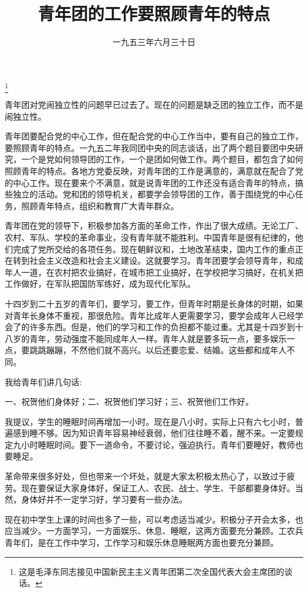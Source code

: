 
\title{青年团的工作要照顾青年的特点}
\date{一九五三年六月三十日}
\thanks{这是毛泽东同志接见中国新民主主义青年团第二次全国代表大会主席团的谈话。}
\maketitle


青年团对党闹独立性的问题早已过去了。现在的问题是缺乏团的独立工作，而不是闹独立性。

青年团要配合党的中心工作，但在配合党的中心工作当中，要有自己的独立工作，要照顾青年的特点。一九五二年我同团中央的同志谈话，出了两个题目要团中央研究，一个是党如何领导团的工作，一个是团如何做工作。两个题目，都包含了如何照顾青年的特点。各地方党委反映，对青年团的工作是满意的，满意就在配合了党的中心工作。现在要来个不满意，就是说青年团的工作还没有适合青年的特点，搞些独立的活动。党和团的领导机关，都要学会领导团的工作，善于围绕党的中心任务，照顾青年特点，组织和教育广大青年群众。

青年团在党的领导下，积极参加各方面的革命工作，作出了很大成绩。无论工厂、农村、军队、学校的革命事业，没有青年就不能胜利。中国青年是很有纪律的，他们完成了党所交给的各项任务。现在朝鲜议和，土地改革结束，国内工作的重点正在转到社会主义改造和社会主义建设。这就要学习。青年团要学会领导青年，和成年人一道，在农村把农业搞好，在城市把工业搞好，在学校把学习搞好，在机关把工作做好，在军队把国防军练好，成为现代化军队。

十四岁到二十五岁的青年们，要学习，要工作，但青年时期是长身体的时期，如果对青年长身体不重视，那很危险。青年比成年人更需要学习，要学会成年人已经学会了的许多东西。但是，他们的学习和工作的负担都不能过重。尤其是十四岁到十八岁的青年，劳动强度不能同成年人一样。青年人就是要多玩一点，要多娱乐一点，要跳跳蹦蹦，不然他们就不高兴。以后还要恋爱、结婚。这些都和成年人不同。

我给青年们讲几句话:

一、祝贺他们身体好；二、祝贺他们学习好；三、祝贺他们工作好。

我提议，学生的睡眠时间再增加一小时。现在是八小时，实际上只有六七小时，普遍感到睡不够。因为知识青年容易神经衰弱，他们往往睡不着，醒不来。一定要规定九小时睡眠时间。要下一道命令，不要讨论，强迫执行。青年们要睡好，教师也要睡足。

革命带来很多好处，但也带来一个坏处，就是大家太积极太热心了，以致过于疲劳。现在要保证大家身体好，保证工人、农民、战士、学生、干部都要身体好。当然，身体好并不一定学习好，学习要有一些办法。

现在初中学生上课的时间也多了一些，可以考虑适当减少。积极分子开会太多，也应当减少。一方面学习，一方面娱乐、休息、睡眠，这两方面要充分兼顾。工农兵青年们，是在工作中学习，工作学习和娱乐休息睡眠两方面也要充分兼顾。

